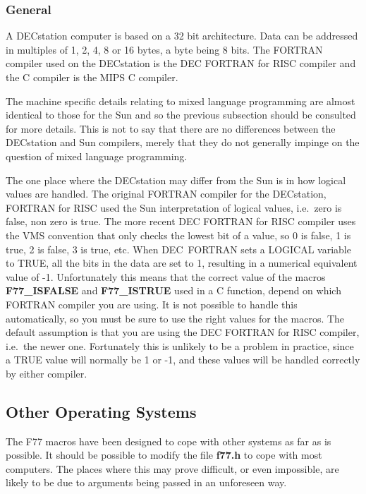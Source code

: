 \subsubsection{General}

A DECstation computer is based on a 32 bit architecture. Data can be addressed
in multiples of 1, 2, 4, 8 or 16 bytes, a byte being 8 bits. The FORTRAN
compiler used on the DECstation is the DEC FORTRAN for RISC compiler and the
C compiler is the MIPS C compiler.

The machine specific details relating to mixed language programming are
almost identical to those for the Sun and so the previous subsection should be
consulted for more details. This is not to say that there are no differences
between the DECstation and Sun compilers, merely that they do not generally
impinge on the question of mixed language programming.

The one place where the DECstation may differ from the Sun is in how logical
values are handled. The original FORTRAN compiler for the DECstation, FORTRAN
for RISC used the Sun interpretation of logical values, i.e.\ zero is false,
non zero is true. The more recent DEC FORTRAN for RISC compiler uses the VMS
convention that only checks the lowest bit of a value, so 0 is false, 1 is
true, 2 is false, 3 is true, etc. When DEC~FORTRAN sets a LOGICAL variable to
TRUE, all the bits in the data are set to 1, resulting in a numerical
equivalent value of -1. Unfortunately this means that the correct value of the
macros {\bf F77\_ISFALSE} and {\bf F77\_ISTRUE} used in a C function, depend on
which FORTRAN compiler you are using. It is not possible to handle this
automatically, so you must be sure to use the right values for the macros. The
default assumption is that you are using the DEC FORTRAN for RISC compiler,
i.e.\ the newer one. Fortunately this is unlikely to be a problem in practice,
since a TRUE value will normally be 1 or -1, and these values will be handled
correctly by either compiler.

\subsection{Other Operating Systems}

The F77 macros have been designed to cope with other systems as far as is
possible. It should be possible to modify the file {\bf f77.h} to cope with
most computers. The places where this may prove difficult, or even impossible,
are likely to be due to arguments being passed in an unforeseen way.

